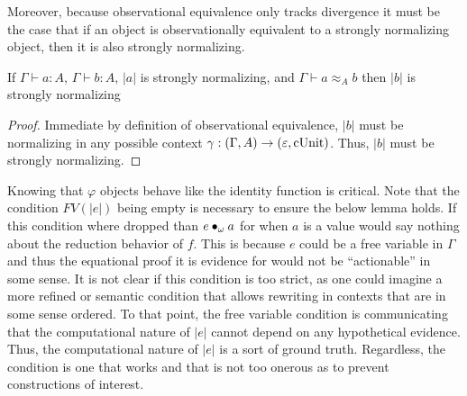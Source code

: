 Moreover, because observational equivalence only tracks divergence it must be the case that if an object is observationally equivalent to a strongly normalizing object, then it is also strongly normalizing.

\begin{lemma}
    \label{lem:5:obs_implies_sn}
    If $\Gamma \vdash a : A$, $\Gamma \vdash b : A$, $|a|$ is strongly normalizing, and $\Gamma \vdash a \approx_A b$ then $|b|$ is strongly normalizing
\end{lemma}
\begin{proof}
    Immediate by definition of observational equivalence, $|b|$ must be normalizing in any possible context $\gamma : (\Gamma, A) \to (\varepsilon, \textnormal{cUnit})$.
    Thus, $|b|$ must be strongly normalizing.
\end{proof}

Knowing that $\varphi$ objects behave like the identity function is critical.
Note that the condition $FV(|e|)$ being empty is necessary to ensure the below lemma holds.
If this condition where dropped than $e \bullet_{\omega} a$ for when $a$ is a value would say nothing about the reduction behavior of $f$.
This is because $e$ could be a free variable in $\Gamma$ and thus the equational proof it is evidence for would not be ``actionable'' in some sense.
It is not clear if this condition is too strict, as one could imagine a more refined or semantic condition that allows rewriting in contexts that are in some sense ordered.
To that point, the free variable condition is communicating that the computational nature of $|e|$ cannot depend on any hypothetical evidence.
Thus, the computational nature of $|e|$ is a sort of ground truth.
Regardless, the condition is one that works and that is not too onerous as to prevent constructions of interest.

